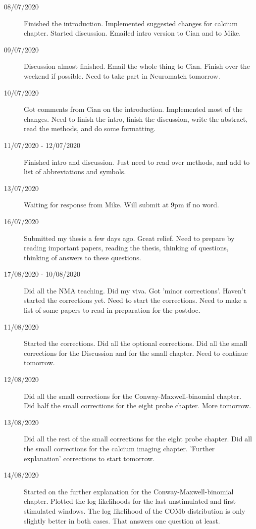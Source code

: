 \documentclass[a4paper,12pt]{article}
\theoremstyle{definition}
\begin{document}
\begin{description}
	\item[08/07/2020] Finished the introduction. Implemented suggested changes for calcium chapter. Started discussion. Emailed intro version to Cian and to Mike.

	\item[09/07/2020] Discussion almost finished. Email the whole thing to Cian. Finish over the weekend if possible. Need to take part in Neuromatch tomorrow.

	\item[10/07/2020] Got comments from Cian on the introduction. Implemented most of the changes. Need to finish the intro, finish the discussion, write the abstract, read the methods, and do some formatting.

	\item[11/07/2020 - 12/07/2020] Finished intro and discussion. Just need to read over methods, and add to list of abbreviations and symbols.

	\item[13/07/2020] Waiting for response from Mike. Will submit at 9pm if no word.

  \item[16/07/2020] Submitted my thesis a few days ago. Great relief. Need to prepare by reading important papers, reading the thesis, thinking of questions, thinking of answers to these questions.

	\item[17/08/2020 - 10/08/2020] Did all the NMA teaching. Did my viva. Got 'minor corrections'. Haven't started the corrections yet. Need to start the corrections. Need to make a list of some papers to read in preparation for the postdoc.

	\item[11/08/2020] Started the corrections. Did all the optional corrections. Did all the small corrections for the Discussion and for the small chapter. Need to continue tomorrow.

	\item[12/08/2020] Did all the small corrections for the Conway-Maxwell-binomial chapter. Did half the small corrections for the eight probe chapter. More tomorrow.

	\item[13/08/2020] Did all the rest of the small corrections for the eight probe chapter. Did all the small corrections for the calcium imaging chapter. 'Further explanation' corrections to start tomorrow.

	\item[14/08/2020] Started on the further explanation for the Conway-Maxwell-binomial chapter. Plotted the log likelihoods for the last unstimulated and first stimulated windows. The log likelihood of the COMb distribution is only slightly better in both cases. That answers one question at least.


\end{description}
\end{document}
